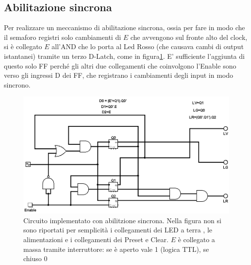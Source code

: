 \documentclass[10pt,a4paper]{article}
\begin{document}
\subsection{Abilitazione sincrona}
Per realizzare un meccanismo di abilitazione sincrona, ossia per fare in modo che il semaforo registri solo cambiamenti di $E$ che avvengono sul fronte alto del clock, si è collegato $E$ all'AND che lo porta al Led Rosso (che causava cambi di output istantanei) tramite un terzo D-Latch, come in figura\ref{fig:circcompletesincrono}.
E' sufficiente l'aggiunta di questo solo FF perché gli altri due collegamenti che coinvolgono l'Enable sono verso gli ingressi D dei FF, che registrano i cambiamenti degli input in modo sincrono.
\begin{figure}[!htb]
\centering
\includegraphics[scale=0.5]{circcompletesincrono.png}
\caption{Circuito implementato con abilitzione sincrona. Nella figura non si sono riportati per semplicità i collegamenti dei LED a terra , le alimentazioni e i collegamenti dei Preset e Clear. $E$ è collegato a massa tramite interruttore: se è aperto vale 1 (logica TTL), se chiuso 0\label{fig:circcompletesincrono}}
\end{figure}

\end{document}
